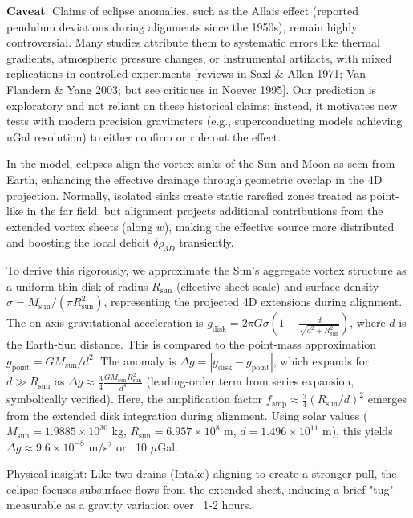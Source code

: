 \textbf{Caveat}: Claims of eclipse anomalies, such as the Allais effect (reported pendulum deviations during alignments since the 1950s), remain highly controversial. Many studies attribute them to systematic errors like thermal gradients, atmospheric pressure changes, or instrumental artifacts, with mixed replications in controlled experiments [reviews in Saxl \& Allen 1971; Van Flandern \& Yang 2003; but see critiques in Noever 1995]. Our prediction is exploratory and not reliant on these historical claims; instead, it motivates new tests with modern precision gravimeters (e.g., superconducting models achieving nGal resolution) to either confirm or rule out the effect.

In the model, eclipses align the vortex sinks of the Sun and Moon as seen from Earth, enhancing the effective drainage through geometric overlap in the 4D projection. Normally, isolated sinks create static rarefied zones treated as point-like in the far field, but alignment projects additional contributions from the extended vortex sheets (along $w$), making the effective source more distributed and boosting the local deficit $\delta \rho_{3D}$ transiently.

To derive this rigorously, we approximate the Sun's aggregate vortex structure as a uniform thin disk of radius $R_\text{sun}$ (effective sheet scale) and surface density $\sigma = M_\text{sun} / (\pi R_\text{sun}^2)$, representing the projected 4D extensions during alignment. The on-axis gravitational acceleration is $g_{\text{disk}} = 2 \pi G \sigma \left(1 - \frac{d}{\sqrt{d^2 + R_\text{sun}^2}}\right)$, where $d$ is the Earth-Sun distance. This is compared to the point-mass approximation $g_{\text{point}} = G M_\text{sun} / d^2$. The anomaly is $\Delta g = |g_{\text{disk}} - g_{\text{point}}|$, which expands for $d \gg R_\text{sun}$ as $\Delta g \approx \frac{3}{4} \frac{G M_\text{sun} R_\text{sun}^2}{d^4}$ (leading-order term from series expansion, symbolically verified). Here, the amplification factor $f_{\text{amp}} \approx \frac{3}{4} (R_\text{sun}/d)^2$ emerges from the extended disk integration during alignment. Using solar values ($M_\text{sun} = 1.9885 \times 10^{30}$ kg, $R_\text{sun} = 6.957 \times 10^8$ m, $d = 1.496 \times 10^{11}$ m), this yields $\Delta g \approx 9.6 \times 10^{-8}$ m/s$^2$ or ~10 $\mu$Gal.

Physical insight: Like two drains (Intake) aligning to create a stronger pull, the eclipse focuses subsurface flows from the extended sheet, inducing a brief "tug" measurable as a gravity variation over ~1-2 hours.

